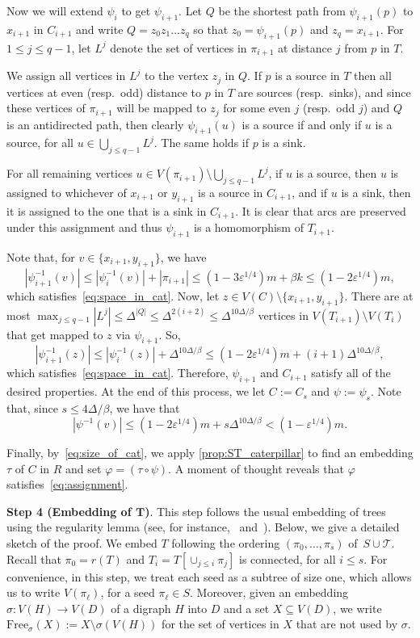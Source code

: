 \documentclass[11pt]{article}
\numberwithin{equation}{section}
\newcommand{\inv}{^{-1}}
\renewcommand{\leq}{\leqslant}
\def\inv{^{-1}}
\def\Free{\mathrm{Free}}
\let\eps=\varepsilon
\let\phi=\varphi
\newcommand{\cT}{\mathcal{T}}
\theoremstyle{definition}
\def\eps{{\varepsilon}}
\begin{document}
Now we will extend $\psi_{i}$ to get $\psi_{i+1}$. 
Let $Q$ be the shortest path from $\psi_{i+1}(p)$ to $x_{i+1}$ in $C_{i+1}$ and write $Q = z_0z_1\dots z_q$ so that $z_0 = \psi_{i+1}(p)$ and $z_q = x_{i+1}$. For $1\leq j\leq q-1$, let $L^j$ denote the set of vertices in $\pi_{i+1}$ at distance $j$ from $p$ in $T$. 

We assign all vertices in $L^j$ to the vertex $z_j$ in $Q$. If $p$ is a source in $T$ then all vertices at even (resp.\ odd) distance to $p$ in $T$ are sources (resp.\ sinks), and since these vertices of $\pi_{i+1}$ will be mapped to $z_j$ for some even $j$ (resp.\ odd $j$) and $Q$ is an antidirected path, then clearly $\psi_{i+1}(u)$ is a source if and only if $u$ is a source, for all $u\in \bigcup_{j \leq q-1} L^j$. The same holds if $p$ is a sink.

For all remaining vertices $u\in V(\pi_{i+1}) \setminus \bigcup_{j\leq q-1} L^j$, if $u$ is a source, then $u$ is assigned to whichever of $x_{i+1}$ or $y_{i+1}$ is a source in $C_{i+1}$, and if $u$ is a sink, then it is assigned to the one that is a sink in $C_{i+1}$. It is clear that arcs are preserved under this assignment and thus $\psi_{i+1}$ is a homomorphism of $T_{i+1}$.

Note that, for $v \in \{x_{i+1}, y_{i+1}\}$, we have
\[
    |\psi^{-1}_{i+1}(v)| \leq |\psi^{-1}_{i}(v)| + |\pi_{i+1}| \leq (1-3\eps^{1/4})m + \beta k \leq (1-2\eps^{1/4})m,
\]
which satisfies~\eqref{eq:space_in_cat}. Now, let $z \in V(C)\setminus \{x_{i+1},y_{i+1}\}$.
There are at most $\max_{j\leq {q-1}}|L^{j}|\leq \Delta^{|Q|}\leq \Delta^{2(i+2)}\leq \Delta^{10\Delta/\beta}$ vertices in $V(T_{i+1}) \setminus V(T_i)$ that get mapped to $z$ via $\psi_{i+1}$. So,
\[
    |\psi^{-1}_{i+1}(z)| \leq |\psi^{-1}_{i}(z)| + \Delta^{10\Delta/\beta} \leq (1-2\eps^{1/4})m + (i+1)\Delta^{10\Delta/\beta},
\]
which satisfies~\eqref{eq:space_in_cat}. Therefore, $\psi_{i+1}$ and $C_{i+1}$ satisfy all of the desired properties. At the end of this process, we let $C := C_s$ and $\psi := \psi_s$. Note that, since $s \leq 4\Delta/\beta$, we
have that
\[
    |\psi\inv(v)| \leq (1-2\eps^{1/4})m + s\Delta^{10\Delta/\beta}<(1-\eps^{1/4})m.
\]

Finally, by~\eqref{eq:size_of_cat}, we apply \cref{prop:ST_caterpillar} to find an embedding $\tau$ of $C$ in $R$ and set $\phi = (\tau \circ \psi)$.
A moment of thought reveals that $\phi$ satisfies~\eqref{eq:assignment}.

\textbf{Step 4 (Embedding of $\boldsymbol{T}$)}.
This step follows the usual embedding of trees using the regularity lemma (see, for instance,~\cite{Stein_Zarate-Gueren_2024} and~\cite{BPS1}). Below, we give a detailed sketch of the proof.
We embed $T$ following the
ordering $(\pi_0,\dots,\pi_s)$ of~${S \cup \cT}$. Recall that $\pi_0 = r(T)$
and $T_i = T[\cup_{j \leq i} \pi_j]$ is connected, for all $i \leq s$. 
For convenience, in this step, we treat each seed as a subtree of size one, which allows us
to write $V(\pi_\ell)$, for a seed $\pi_\ell \in S$. Moreover, given
an embedding $\sigma: V(H)\rightarrow V(D)$ of a digraph $H$ into $D$ and a set $X \subseteq V(D)$, we write
$\Free_{\sigma}(X) := X \setminus \sigma(V(H))$ for the set of vertices in $X$ that are
not used by $\sigma$.
\end{document}
